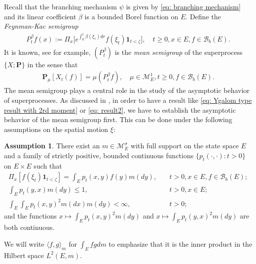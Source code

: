 \documentclass[12pt,a4paper]{amsart}
\theoremstyle{definition}
\newtheorem{asp}{Assumption}
\numberwithin{equation}{section}
\begin{document}
Recall that the branching mechanism $\psi$ is given by \eqref{eq: branching mechanism} and its linear coefficient $\beta$ is a bounded Borel function on $E$. Define the \emph{Feynman-Kac semigroup}
\begin{align}
  P^\beta_tf(x)
  := \Pi_x \big[e^{\int_0^{t} \beta(\xi_r)dr} f(\xi_t)\mathbf 1_{t<\zeta}\big],
  \quad t\geq 0, x\in E, f\in \mathscr B_b(E).
\end{align}
It is known, see \cite[Proposition 2.27]{Li2011Measure-valued} for example, $(P^\beta_t)$ is the \emph{mean semigroup} of the superprocess $\{X; \mathbf P\}$ in the sense that
\begin{align}
\label{eq:mean_formula}
	\mathbf P_\mu [X_t(f)]
	= \mu(P^\beta_t f),
	\quad \mu \in \mathcal M^1_E,
	t \geq 0,f \in \mathscr B_b(E).
\end{align}
The mean semigroup plays a central role in the study of the asymptotic behavior of superprocesses.
As discussed in \cite{EvansPerkins1990Measure-valued}, in order to have a result like \eqref{eq: Ygalom type result with 2rd moment} or \eqref{eq: result2}, we have to establish the asymptotic behavior of the mean semigroup first.
This can be done under the following assumptions on the spatial motion $\xi$:
\begin{asp} \label{asp: 1}
  There exist an $m \in \mathcal M_E^\sigma$ with full support on the state space $E$ and a family of strictly positive,
	bounded continuous functions $\{ p_t(\cdot,\cdot): t > 0 \}$ on $E \times E$ such that
  \begin{align}
    \Pi_x[ f(\xi_t)\mathbf 1_{t < \zeta} ]
    = \int_E p_t(x,y) f(y) m(dy),
    &\quad t>0, x \in E,f \in \mathscr B_b(E);
    \\\int_E p_t(y,x)m(dy)
    \leq 1,	
    &\quad t>0,x\in E;
    \\\int_E \int_E p_t(x,y)^2 m(dx) m(dy)
    <\infty,
    &\quad t> 0;
  \end{align}
	and the functions $x \mapsto \int_E p_t(x,y)^2 m(dy)$ and $x \mapsto \int_E p_t(y,x)^2 m(dy)$ are both continuous.
\end{asp}

We will write $\langle f, g\rangle_m$ for $\int_E fg dm$ to emphasize that it is the inner product in the Hilbert space $L^2(E, m)$.
\end{document}
